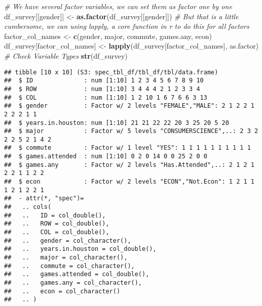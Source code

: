 \documentclass[
]{book}
\newenvironment{Shaded}{\begin{snugshade}}{\end{snugshade}}
\newcommand{\CommentTok}[1]{\textcolor[rgb]{0.56,0.35,0.01}{\textit{#1}}}
\newcommand{\KeywordTok}[1]{\textcolor[rgb]{0.13,0.29,0.53}{\textbf{#1}}}
\newcommand{\NormalTok}[1]{#1}
\newcommand{\StringTok}[1]{\textcolor[rgb]{0.31,0.60,0.02}{#1}}
\begin{document}
\begin{Shaded}
\begin{Highlighting}[]
\CommentTok{\# We have several factor variables, we can set them as factor one by one}
\NormalTok{df\_survey[[}\StringTok{\textquotesingle{}gender\textquotesingle{}}\NormalTok{]] \textless{}{-}}\StringTok{ }\KeywordTok{as.factor}\NormalTok{(df\_survey[[}\StringTok{\textquotesingle{}gender\textquotesingle{}}\NormalTok{]])}
\CommentTok{\# But that is a little cumbersome, we can using lapply, a core function in r to do this for all factors}
\NormalTok{factor\_col\_names \textless{}{-}}\StringTok{ }\KeywordTok{c}\NormalTok{(}\StringTok{\textquotesingle{}gender\textquotesingle{}}\NormalTok{, }\StringTok{\textquotesingle{}major\textquotesingle{}}\NormalTok{, }\StringTok{\textquotesingle{}commute\textquotesingle{}}\NormalTok{, }\StringTok{\textquotesingle{}games.any\textquotesingle{}}\NormalTok{, }\StringTok{\textquotesingle{}econ\textquotesingle{}}\NormalTok{)}
\NormalTok{df\_survey[factor\_col\_names] \textless{}{-}}\StringTok{ }\KeywordTok{lapply}\NormalTok{(df\_survey[factor\_col\_names], as.factor)}
\CommentTok{\# Check Variable Types}
\KeywordTok{str}\NormalTok{(df\_survey)}
\end{Highlighting}
\end{Shaded}

\begin{verbatim}
## tibble [10 x 10] (S3: spec_tbl_df/tbl_df/tbl/data.frame)
##  $ ID              : num [1:10] 1 2 3 4 5 6 7 8 9 10
##  $ ROW             : num [1:10] 3 4 4 4 2 1 2 3 3 4
##  $ COL             : num [1:10] 1 2 10 1 6 7 6 6 3 13
##  $ gender          : Factor w/ 2 levels "FEMALE","MALE": 2 1 2 2 1 2 2 2 1 1
##  $ years.in.houston: num [1:10] 21 21 22 22 20 3 25 20 5 20
##  $ major           : Factor w/ 5 levels "CONSUMERSCIENCE",..: 2 3 2 2 2 5 2 1 4 2
##  $ commute         : Factor w/ 1 level "YES": 1 1 1 1 1 1 1 1 1 1
##  $ games.attended  : num [1:10] 0 2 0 14 0 0 25 2 0 0
##  $ games.any       : Factor w/ 2 levels "Has.Attended",..: 2 1 2 1 2 2 1 1 2 2
##  $ econ            : Factor w/ 2 levels "ECON","Not.Econ": 1 2 1 1 1 2 1 2 2 1
##  - attr(*, "spec")=
##   .. cols(
##   ..   ID = col_double(),
##   ..   ROW = col_double(),
##   ..   COL = col_double(),
##   ..   gender = col_character(),
##   ..   years.in.houston = col_double(),
##   ..   major = col_character(),
##   ..   commute = col_character(),
##   ..   games.attended = col_double(),
##   ..   games.any = col_character(),
##   ..   econ = col_character()
##   .. )
\end{verbatim}
\end{document}
